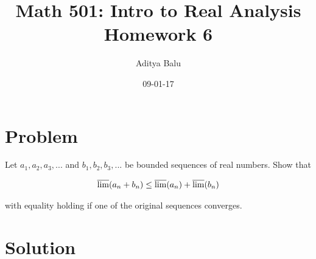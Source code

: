 \documentclass[]{article}
\title{Math 501: Intro to Real Analysis\\Homework 6}
\date{09-01-17}
\author{Aditya Balu}
\begin{document}
\maketitle

\section*{Problem}
Let $a_1, a_2, a_3, ...$ and $b_1, b_2, b_3, ...$ be bounded sequences of real numbers. Show that

\begin{center}
	\begin{align}
		\varlimsup (a_n +b_n) \leq \varlimsup(a_n) + \varlimsup(b_n)	
	\end{align}
\end{center}
with equality holding if one of the original sequences converges.

\section*{Solution}
\end{document}
